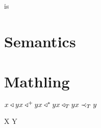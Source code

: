 \documentclass{kharticle}
\begin{document}
\begin{examplebox}
\end{examplebox}

\begin{examplebox}
 is 
\end{examplebox}


\section{Semantics}

\begin{examplebox}
 \par
\typeet \par
\typeeet \par
\typeett \par
\typeetet
\end{examplebox}

\begin{examplebox}
\end{examplebox}


\section{Mathling}

\begin{examplebox}
\begin{math}
x \triangleleft y \\
x \triangleleft^+ y \\
x \triangleleft^* y \\
x \triangleleft_T y \\
x \prec_T y
\end{math}
\end{examplebox}

\begin{examplebox}
\ledge \redge \tedge \bedge \slot \par
{} \par
{} \par
{} \par
X \mergedot Y \par
\end{examplebox}
\end{document}
